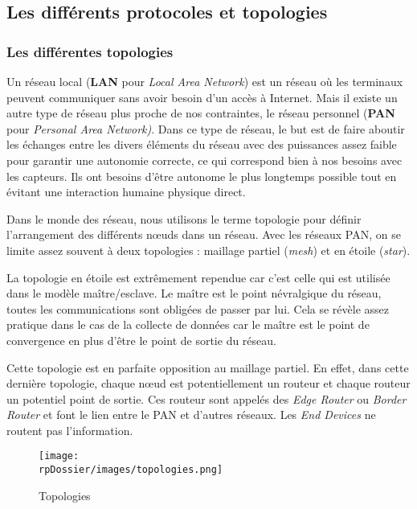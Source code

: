 
\subsection{Les différents protocoles et topologies}

\subsubsection{Les différentes topologies}

Un réseau local (\textbf{LAN} pour \textit{Local Area Network}) est un réseau où les terminaux peuvent communiquer sans avoir besoin d'un accès à Internet. Mais il existe un autre type de réseau plus proche de nos contraintes, le réseau personnel (\textbf{PAN} pour \textit{Personal Area Network)}. Dans ce type de réseau, le but est de faire aboutir les échanges entre les divers éléments du réseau avec des puissances assez faible pour garantir une autonomie correcte, ce qui correspond bien à nos besoins avec les capteurs. Ils ont besoins d'être autonome le plus longtemps possible tout en évitant une interaction humaine physique direct. 

Dans le monde des réseau, nous utilisons le terme topologie pour définir l'arrangement des différents nœuds dans un réseau. Avec les réseaux PAN, on se limite assez souvent à deux topologies : maillage partiel (\textit{mesh}) et en étoile (\textit{star}).

La topologie en étoile est extrêmement rependue car c'est celle qui est utilisée dans le modèle maître/esclave. Le maître est le point névralgique du réseau, toutes les communications sont obligées de passer par lui. Cela se révèle assez pratique dans le cas de la collecte de données car le maître est le point de convergence en plus d'être le point de sortie du réseau.

Cette topologie est en parfaite opposition au maillage partiel. En effet, dans cette dernière topologie, chaque nœud est potentiellement un routeur et chaque routeur un potentiel point de sortie. Ces routeur sont appelés des \textit{Edge Router} ou \textit{Border Router} et font le lien entre le PAN et d'autres réseaux. Les \textit{End Devices} ne routent pas l'information.

\begin{figure}[h]
\centering
\texttt{[image: \\rpDossier/images/topologies.png]}
\caption{Topologies}
\label{topologies}
\end{figure}

